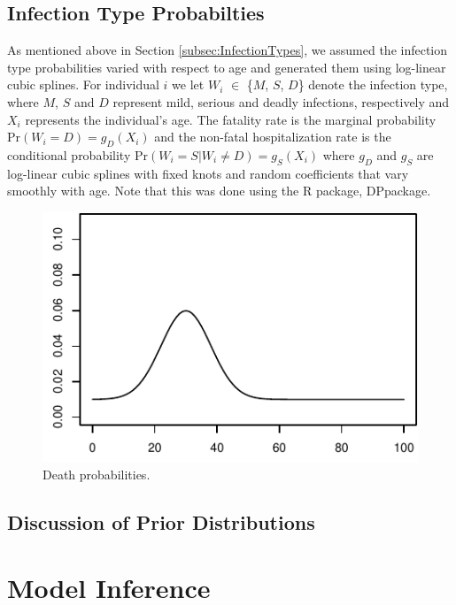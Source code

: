 \documentclass[12pt]{article}
\begin{document}
\subsection{Infection Type Probabilties}
\label{subsec:infectionTypeProbs}

As mentioned above in Section \ref{subsec:InfectionTypes}, we assumed the infection type probabilities varied with respect to age 
and generated them using log-linear cubic splines.  For individual $i$ we let $W_i$ $\in$ \{$M$, $S$, $D$\}
denote the infection type, where $M$, $S$ and $D$ represent mild,
serious and deadly infections, respectively and $X_i$ represents the
individual's age. The fatality rate is the marginal probability
$\mbox{Pr}(W_i = D) = g_D(X_i)$ and the non-fatal hospitalization
rate is the conditional probability $\mbox{Pr}(W_i = S|W_i \neq D)=
g_S(X_i)$  where $g_D$ and $g_S$ are log-linear cubic splines with
fixed knots and random coefficients that vary smoothly with age.  Note that this was done using the R package, DPpackage.


 \begin{figure}[!h]
 \begin{center}
\includegraphics{Figures/G-ageVaryingDeadly}
 \end{center}
 \caption{Death probabilities.}
 \label{fig:ageVaryingDeadly}
 \end{figure}
   
\subsection{Discussion of Prior Distributions}         
        
\section{Model Inference}
\label{sec:modelInference}
\end{document}
